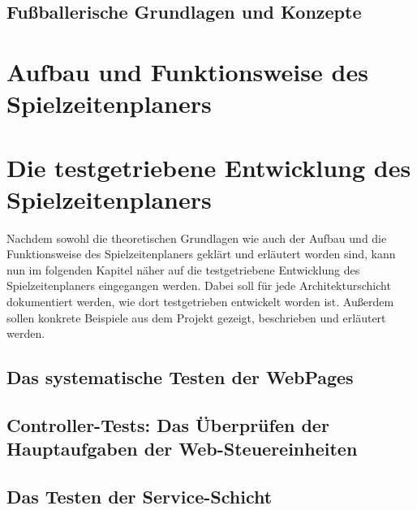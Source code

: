 \subsection{Fußballerische Grundlagen und Konzepte}



\clearpage


\section{Aufbau und Funktionsweise des Spielzeitenplaners}



\clearpage


\section{Die testgetriebene Entwicklung des Spielzeitenplaners}

Nachdem sowohl die theoretischen Grundlagen wie auch der Aufbau und die Funktionsweise 
des Spielzeitenplaners geklärt und erläutert worden sind, kann nun im folgenden Kapitel 
näher auf die testgetriebene Entwicklung des Spielzeitenplaners eingegangen werden. 
Dabei soll für jede Architekturschicht dokumentiert werden, wie dort testgetrieben 
entwickelt worden ist. Außerdem sollen konkrete Beispiele aus dem Projekt gezeigt, 
beschrieben und erläutert werden. 


\subsection{Das systematische Testen der WebPages}




\subsection{Controller-Tests: Das Überprüfen der Hauptaufgaben der Web-Steuereinheiten}




\subsection{Das Testen der Service-Schicht}

